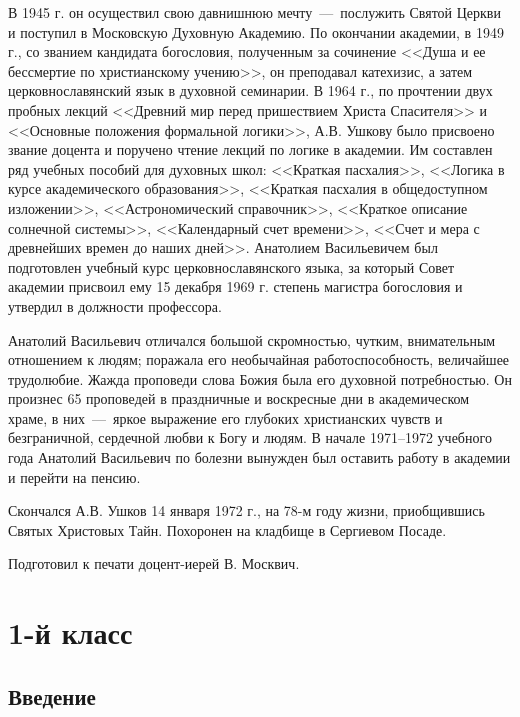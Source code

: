 \documentclass[11pt,a4paper,oneside]{memoir}
\begin{document}
    В 1945 г. он осуществил свою давнишнюю мечту~---~послужить Святой Церкви и поступил в Московскую Духовную Академию. По окончании академии, в 1949 г., со званием кандидата богословия, полученным за сочинение <<Душа и ее бессмертие по христианскому учению>>, он преподавал катехизис, а затем церковнославянский язык в духовной семинарии. В 1964 г., по прочтении двух пробных лекций <<Древний мир перед пришествием Христа Спасителя>> и <<Основные положения формальной логики>>, А.В. Ушкову было присвоено звание доцента и поручено чтение лекций по логике в академии. Им составлен ряд учебных пособий для духовных школ: <<Краткая пасхалия>>, <<Логика в курсе академического образования>>, <<Краткая пасхалия в общедоступном изложении>>, <<Астрономический справочник>>, <<Краткое описание солнечной системы>>, <<Календарный счет времени>>, <<Счет и мера с древнейших времен до наших дней>>. Анатолием Васильевичем был подготовлен учебный курс церковнославянского языка, за который Совет академии присвоил ему 15 декабря 1969 г. степень магистра богословия и утвердил в должности профессора.
    
    Анатолий Васильевич отличался большой скромностью, чутким, внимательным отношением к людям; поражала его необычайная работоспособность, величайшее трудолюбие. Жажда проповеди слова Божия была его духовной потребностью. Он произнес 65 проповедей в праздничные и воскресные дни в академическом храме, в них~---~яркое выражение его глубоких христианских чувств и безграничной, сердечной любви к Богу и людям. В начале 1971--1972 учебного года Анатолий Васильевич по болезни вынужден был оставить работу в академии и перейти на пенсию.
    
    Скончался А.В. Ушков 14 января 1972 г., на 78-м году жизни, приобщившись Святых Христовых Тайн. Похоронен на кладбище в Сергиевом Посаде.
    
    \medskip
    Подготовил к печати доцент-иерей В. Москвич.
    
    \chapter*{1-й класс}
    \label{ch:firstgrade}
        \section*{Введение}
        \label{sec:intro}
\end{document}
